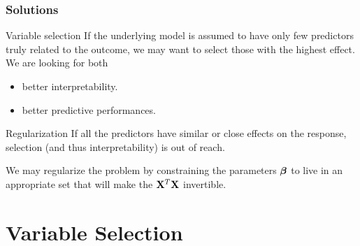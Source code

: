 \documentclass[10pt, c, xcolor=x11names]{beamer}\usepackage[]{graphicx}\usepackage[]{color}
\begin{document}
\begin{frame}
  \frametitle{Solutions}

  \begin{block}{Variable selection}
    If the  underlying model  is assumed to  have only  few predictors
    truly related to the outcome,  we may want to \alert{select} those
    with the highest effect. We are looking for both
    \begin{itemize}
    \item better interpretability.
    \item better predictive performances.
    \end{itemize}
  \end{block}

  \vfill

  \begin{block}{Regularization}
    If  all  the predictors  have  similar  or  close effects  on  the
    response, selection (and thus interpretability) is out of reach.

    We may \alert{regularize} the problem by \alert{constraining} the
    parameters $\boldsymbol\beta$ to  live in an appropriate set  that will make
    the $\mathbf{X}^T\mathbf{X}$ invertible.
  \end{block}

\end{frame}
 
\section{Variable Selection}
 
\end{document}
